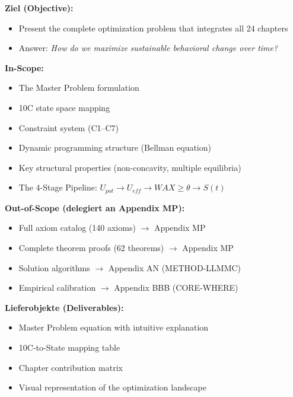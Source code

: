 \begin{tcolorbox}[colback=orange!5!white,colframe=orange!75!black,
    title=\textbf{Chapter Scope: Ziel / In-Scope / Out-of-Scope / Lieferobjekte}]

\textbf{Ziel (Objective):}
\begin{itemize}[nosep]
    \item Present the complete optimization problem that integrates all 24 chapters
    \item Answer: \textit{How do we maximize sustainable behavioral change over time?}
\end{itemize}

\textbf{In-Scope:}
\begin{itemize}[nosep]
    \item The Master Problem formulation
    \item 10C state space mapping
    \item Constraint system (C1--C7)
    \item Dynamic programming structure (Bellman equation)
    \item Key structural properties (non-concavity, multiple equilibria)
    \item The 4-Stage Pipeline: $U_{pot} \to U_{eff} \to WAX \geq \theta \to S(t)$
\end{itemize}

\textbf{Out-of-Scope (delegiert an Appendix MP):}
\begin{itemize}[nosep]
    \item Full axiom catalog (140 axioms) $\rightarrow$ Appendix MP
    \item Complete theorem proofs (62 theorems) $\rightarrow$ Appendix MP
    \item Solution algorithms $\rightarrow$ Appendix AN (METHOD-LLMMC)
    \item Empirical calibration $\rightarrow$ Appendix BBB (CORE-WHERE)
\end{itemize}

\textbf{Lieferobjekte (Deliverables):}
\begin{itemize}[nosep]
    \item Master Problem equation with intuitive explanation
    \item 10C-to-State mapping table
    \item Chapter contribution matrix
    \item Visual representation of the optimization landscape
\end{itemize}

\end{tcolorbox}

